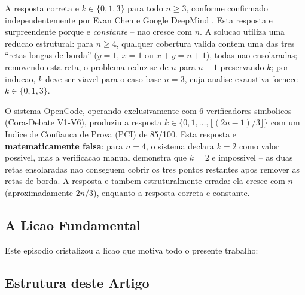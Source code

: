 \documentclass[5p]{elsarticle}
\begin{document}
A resposta correta e $k\in\{0,1,3\}$ para todo $n\geq 3$, conforme confirmado
independentemente por Evan Chen \cite{chen2025} e Google DeepMind \cite{deepmind2025}.
Esta resposta e surpreendente porque e \textit{constante} -- nao cresce com $n$. A
solucao utiliza uma reducao estrutural: para $n\geq 4$, qualquer cobertura valida
contem uma das tres ``retas longas de borda'' ($y=1$, $x=1$ ou $x+y=n+1$), todas
nao-ensolaradas; removendo esta reta, o problema reduz-se de $n$ para $n-1$
preservando $k$; por inducao, $k$ deve ser viavel para o caso base $n=3$, cuja
analise exaustiva fornece $k\in\{0,1,3\}$.

O sistema OpenCode, operando exclusivamente com 6 verificadores simbolicos
(Cora-Debate V1-V6), produziu a resposta $k\in\{0,1,\dots,\lfloor(2n-1)/3\rfloor\}$
com um Indice de Confianca de Prova (PCI) de 85/100. Esta resposta e
\textbf{matematicamente falsa}: para $n=4$, o sistema declara $k=2$ como valor
possivel, mas a verificacao manual demonstra que $k=2$ e impossivel -- as duas
retas ensolaradas nao conseguem cobrir os tres pontos restantes apos remover as
retas de borda. A resposta e tambem estruturalmente errada: ela cresce com $n$
(aproximadamente $2n/3$), enquanto a resposta correta e constante.

\subsection{A Licao Fundamental}

Este episodio cristalizou a licao que motiva todo o presente trabalho:

\begin{center}
\end{center}

\subsection{Estrutura deste Artigo}
\end{document}
